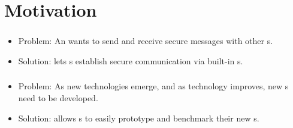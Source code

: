 
\section{Motivation}
\frame{\sectionpage}


\begin{frame} %
\frametitle{\eu}
\begin{itemize}
\item Problem: An \eu{} wants to send and receive
  secure messages with other \eu s.
\item Solution: \cry{} lets \eu s establish
  secure communication via built-in \cs s.
\end{itemize}
\end{frame}

\begin{frame}
\frametitle{\cg}
\begin{itemize}
\item Problem: As new technologies emerge, and as
  technology improves, new \cs s need to
  be developed.
\item Solution: \cry{} allows \cg s to easily prototype
  and benchmark their new \cs s.
\end{itemize}
\end{frame}

